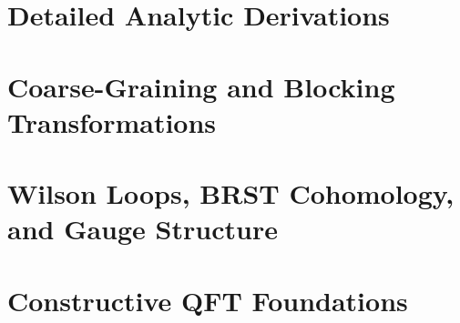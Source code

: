 \documentclass[11pt,a4paper]{report}
\begin{document}
\chapter{Detailed Analytic Derivations}
\label{ch:hard-analysis}







\chapter{Coarse-Graining and Blocking Transformations}
\label{ch:blocking}



\chapter{Wilson Loops, BRST Cohomology, and Gauge Structure}
\label{ch:wilson-brst}





\chapter{Constructive QFT Foundations}
\label{ch:constructive-qft}




\end{document}
